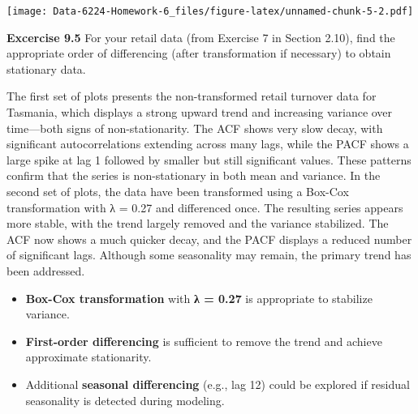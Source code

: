 \documentclass[
]{article}
\newenvironment{Shaded}{\begin{snugshade}}{\end{snugshade}}
\newcommand{\AttributeTok}[1]{\textcolor[rgb]{0.13,0.29,0.53}{#1}}
\newcommand{\DecValTok}[1]{\textcolor[rgb]{0.00,0.00,0.81}{#1}}
\newcommand{\FunctionTok}[1]{\textcolor[rgb]{0.13,0.29,0.53}{\textbf{#1}}}
\newcommand{\NormalTok}[1]{#1}
\newcommand{\SpecialCharTok}[1]{\textcolor[rgb]{0.81,0.36,0.00}{\textbf{#1}}}
\newcommand{\StringTok}[1]{\textcolor[rgb]{0.31,0.60,0.02}{#1}}
\providecommand{\tightlist}{%
  \setlength{\itemsep}{0pt}\setlength{\parskip}{0pt}}
\begin{document}
\begin{Shaded}
\end{Shaded}

\texttt{[image: Data-6224-Homework-6\_files/figure-latex/unnamed-chunk-5-2.pdf]}

\textbf{Excercise 9.5} For your retail data (from Exercise 7 in Section
2.10), find the appropriate order of differencing (after transformation
if necessary) to obtain stationary data.

The first set of plots presents the non-transformed retail turnover data
for Tasmania, which displays a strong upward trend and increasing
variance over time---both signs of non-stationarity. The ACF shows very
slow decay, with significant autocorrelations extending across many
lags, while the PACF shows a large spike at lag 1 followed by smaller
but still significant values. These patterns confirm that the series is
non-stationary in both mean and variance. In the second set of plots,
the data have been transformed using a Box-Cox transformation with λ =
0.27 and differenced once. The resulting series appears more stable,
with the trend largely removed and the variance stabilized. The ACF now
shows a much quicker decay, and the PACF displays a reduced number of
significant lags. Although some seasonality may remain, the primary
trend has been addressed.

\begin{itemize}
\tightlist
\item
  \textbf{Box-Cox transformation} with \textbf{λ = 0.27} is appropriate
  to stabilize variance.
\item
  \textbf{First-order differencing} is sufficient to remove the trend
  and achieve approximate stationarity.
\item
  Additional \textbf{seasonal differencing} (e.g., lag 12) could be
  explored if residual seasonality is detected during modeling.
\end{itemize}
\end{document}
